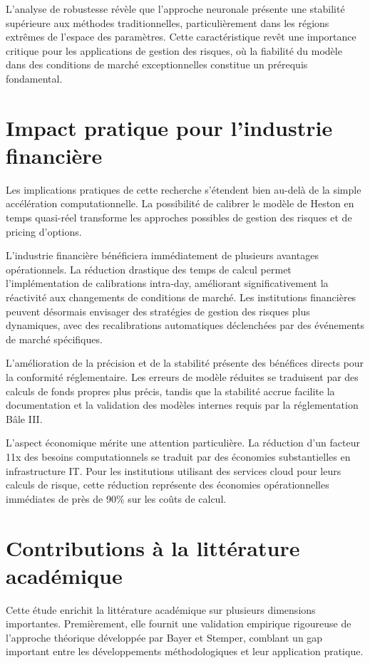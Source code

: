 L'analyse de robustesse révèle que l'approche neuronale présente une stabilité supérieure aux méthodes traditionnelles, particulièrement dans les régions extrêmes de l'espace des paramètres. Cette caractéristique revêt une importance critique pour les applications de gestion des risques, où la fiabilité du modèle dans des conditions de marché exceptionnelles constitue un prérequis fondamental.

\section{Impact pratique pour l'industrie financière}

Les implications pratiques de cette recherche s'étendent bien au-delà de la simple accélération computationnelle. La possibilité de calibrer le modèle de Heston en temps quasi-réel transforme les approches possibles de gestion des risques et de pricing d'options.

L'industrie financière bénéficiera immédiatement de plusieurs avantages opérationnels. La réduction drastique des temps de calcul permet l'implémentation de calibrations intra-day, améliorant significativement la réactivité aux changements de conditions de marché. Les institutions financières peuvent désormais envisager des stratégies de gestion des risques plus dynamiques, avec des recalibrations automatiques déclenchées par des événements de marché spécifiques.

L'amélioration de la précision et de la stabilité présente des bénéfices directs pour la conformité réglementaire. Les erreurs de modèle réduites se traduisent par des calculs de fonds propres plus précis, tandis que la stabilité accrue facilite la documentation et la validation des modèles internes requis par la réglementation Bâle III.

L'aspect économique mérite une attention particulière. La réduction d'un facteur 11x des besoins computationnels se traduit par des économies substantielles en infrastructure IT. Pour les institutions utilisant des services cloud pour leurs calculs de risque, cette réduction représente des économies opérationnelles immédiates de près de 90\% sur les coûts de calcul.

\section{Contributions à la littérature académique}

Cette étude enrichit la littérature académique sur plusieurs dimensions importantes. Premièrement, elle fournit une validation empirique rigoureuse de l'approche théorique développée par Bayer et Stemper, comblant un gap important entre les développements méthodologiques et leur application pratique.

